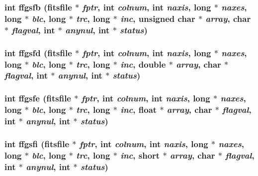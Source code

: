 \subsubsection{\setlength{\rightskip}{0pt plus 5cm}int ffgsfb (\bf{fitsfile} $\ast$ {\em fptr}, int {\em colnum}, int {\em naxis}, long $\ast$ {\em naxes}, long $\ast$ {\em blc}, long $\ast$ {\em trc}, long $\ast$ {\em inc}, unsigned char $\ast$ {\em array}, char $\ast$ {\em flagval}, int $\ast$ {\em anynul}, int $\ast$ {\em status})}\label{src_2fitsio_8h_eec81cbe16bbd72a2ccc01e2b39ccc19}


\subsubsection{\setlength{\rightskip}{0pt plus 5cm}int ffgsfd (\bf{fitsfile} $\ast$ {\em fptr}, int {\em colnum}, int {\em naxis}, long $\ast$ {\em naxes}, long $\ast$ {\em blc}, long $\ast$ {\em trc}, long $\ast$ {\em inc}, double $\ast$ {\em array}, char $\ast$ {\em flagval}, int $\ast$ {\em anynul}, int $\ast$ {\em status})}\label{src_2fitsio_8h_beeb182f75ceb2f94e28d9653b7fd612}


\subsubsection{\setlength{\rightskip}{0pt plus 5cm}int ffgsfe (\bf{fitsfile} $\ast$ {\em fptr}, int {\em colnum}, int {\em naxis}, long $\ast$ {\em naxes}, long $\ast$ {\em blc}, long $\ast$ {\em trc}, long $\ast$ {\em inc}, float $\ast$ {\em array}, char $\ast$ {\em flagval}, int $\ast$ {\em anynul}, int $\ast$ {\em status})}\label{src_2fitsio_8h_a8b0872e27d9bd6b655586b7cbb4ab2a}


\subsubsection{\setlength{\rightskip}{0pt plus 5cm}int ffgsfi (\bf{fitsfile} $\ast$ {\em fptr}, int {\em colnum}, int {\em naxis}, long $\ast$ {\em naxes}, long $\ast$ {\em blc}, long $\ast$ {\em trc}, long $\ast$ {\em inc}, short $\ast$ {\em array}, char $\ast$ {\em flagval}, int $\ast$ {\em anynul}, int $\ast$ {\em status})}\label{src_2fitsio_8h_64fe61a10be1e4a7891e611c2367811a}


